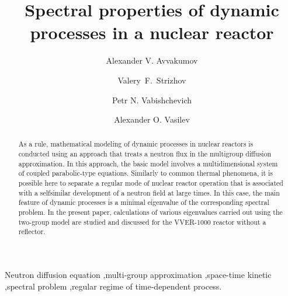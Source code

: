 \documentclass[authoryear]{elsarticle}
\begin{document}
\begin{frontmatter}

\title{Spectral properties of dynamic processes in a nuclear reactor}

\author[ki]{Alexander V. Avvakumov}

\author[nsi]{Valery~F.~Strizhov}

\author[nsi,univ]{Petr N. Vabishchevich}

\author[univ]{Alexander O. Vasilev}

\address[ki]{National Research Center \emph{Kurchatov Institute},  1, Sq. Academician Kurchatov, Moscow, Russia}
\address[nsi]{Nuclear Safety Institute, Russian Academy of Sciences, 52, B. Tulskaya, Moscow, Russia}
\address[univ]{North-Eastern Federal University, 58, Belinskogo, Yakutsk, Russia}


\begin{abstract}
As a rule, mathematical modeling of dynamic processes in nuclear reactors is conducted
using an approach that treats a neutron flux in the multigroup diffusion approximation.
In this approach, the basic model involves a multidimensional system of coupled
parabolic-type equations. Similarly to common thermal phenomena, it is possible here 
to separate a regular mode of nuclear reactor operation that is associated with 
a selfsimilar development of a neutron field at large times. In this case, 
the main feature of dynamic processes is a minimal eigenvalue of the corresponding
spectral problem. In the present paper, calculations of various eigenvalues carried out 
using the two-group model are studied and discussed for the VVER-1000 reactor without
a reflector.
\end{abstract}

\begin{keyword}
Neutron diffusion equation \sep  multi-group approximation \sep space-time kinetic 
\sep spectral problem \sep regular regime of time-dependent process.

\end{keyword}

\end{frontmatter}
\end{document}
